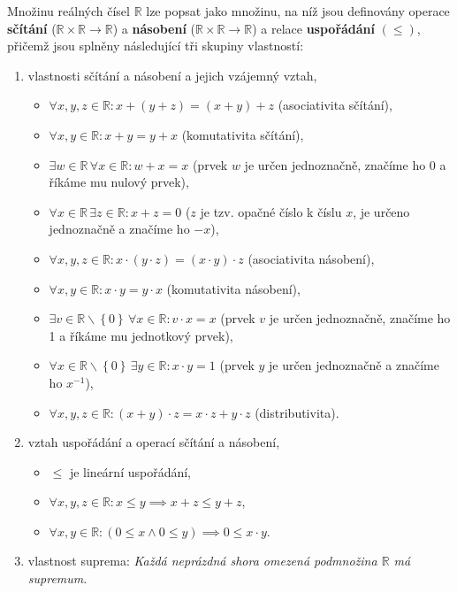 Množinu reálných čísel $\mathbb{R}$ lze popsat jako množinu, na níž jsou definovány operace
\textbf{sčítání} ($\mathbb R \times \mathbb R \to \mathbb R$) a \textbf{násobení} ($\mathbb R \times \mathbb R \to \mathbb R$) a relace \textbf{uspořádání} $(\le)$, přičemž jsou splněny následující tři skupiny vlastností:
\begin{enumerate}
\item[I.] vlastnosti sčítání a násobení a jejich vzájemný vztah,
\begin{itemize}
	\item $\forall x,y,z\in \mathbb R :x+(y+z)=(x+y)+z$ (asociativita sčítání),
\item $\forall x,y\in \mathbb R : x+y = y+x$ (komutativita sčítání),
\item $\exists w \in \mathbb R \, \forall x \in \mathbb R : w+x = x$ (prvek $w$ je určen jednoznačně, značíme ho 0 a říkáme mu nulový prvek),
\item $\forall x \in \mathbb R  \, \exists z \in \mathbb R : x+z=0$ ($z$ je tzv. opačné číslo k číslu $x$, je určeno jednoznačně a značíme ho $-x$),
\item $\forall x,y,z\in \mathbb R :x\cdot(y\cdot z)=(x\cdot y)\cdot z$ (asociativita násobení),
\item $\forall x,y\in \mathbb R : x\cdot y = y\cdot x$ (komutativita násobení),
\item $\exists v \in \mathbb R\smallsetminus \left \{ 0 \right \}  \, \forall x \in \mathbb R : v\cdot x = x$ (prvek $v$ je určen jednoznačně, značíme ho 1 a říkáme mu jednotkový prvek),
\item $\forall x \in \mathbb R\smallsetminus \left \{ 0 \right \}   \, \exists y \in \mathbb R : x\cdot y=1$ (prvek $y$ je určen jednoznačně a značíme ho $x^{-1}$),
\item $\forall x,y,z\in \mathbb R : (x+y)\cdot z = x\cdot z + y\cdot z$ (distributivita).
\end{itemize}
\item[II.] vztah uspořádání a operací sčítání a násobení,
\begin{itemize}
\item $\leq$ je lineární uspořádání,
\item $\forall x,y,z \in \mathbb R : x\leq y \implies x+z \leq y+z$,
\item $\forall x,y \in \mathbb R : (0\leq x \land 0\leq y)\implies 0\leq x\cdot y$.
\end{itemize}
\item[III.] vlastnost suprema: \textit{Každá neprázdná shora omezená podmnožina $\mathbb{R}$ má supremum}.
\end{enumerate}


